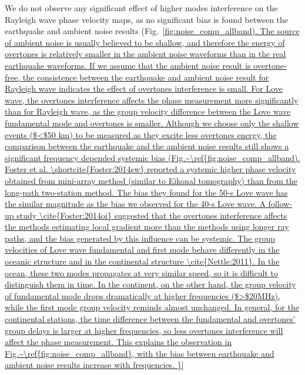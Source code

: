 \documentclass[referee]{gji}
\begin{document}
We do not observe any significant effect of higher modes interference on the Rayleigh wave phase velocity maps, as no significant bias is found between the earthquake and ambient noise results (Fig.~\ref{fig:noise_comp_allband). The source of ambient noise is usually believed to be shallow, and therefore the energy of overtones is relatively smaller in the ambient noise waveforms than in the real earthquake waveforms. If we assume that the ambient noise result is overtone-free, the consistence between the earthquake and ambient noise result for Rayleigh wave indicates the effect of overtones interference is small.

For Love wave, the overtones interference affects the phase measurement more significantly than for Rayleigh wave, as the group velocity difference between the Love wave fundamental mode and overtones is smaller. Although we choose only the shallow events ($<$50 km) to be measured as they excite less overtones energy, the comparison between the earthquake and the ambient noise results still shows a significant frequency depended systemic bias (Fig.~\ref{fig:noise_comp_allband).

Foster et al. \shortcite{Foster:2014sw} reported a systemic higher phase velocity obtained from mini-array method (similar to Eikonal tomography) than from the long-path two-station method. The bias they found for the 50-s Love wave has the similar magnitude as the bias we observed for the 40-s Love wave. A follow-up study \cite{Foster:2014oi} suggested that the overtones interference affects the methods estimating local gradient more than the methods using longer ray paths, and the bias generated by this influence can be systemic.

The group velocities of Love wave fundamental and first mode behave differently in the oceanic structure and in the continental structure \cite{Nettle:2011}. In the ocean, these two modes propagates at very similar speed, so it is difficult to distinguish them in time. In the continent, on the other hand, the group velocity of fundamental mode drops dramatically at higher frequencies ($>$20MHz), while the first mode group velocity reminds almost unchanged. In general, for the continental stations, the time difference between the fundamental and overtones’ group delays is larger at higher frequencies, so less overtones interference will affect the phase measurement. This explains the observation in Fig.~\ref{fig:noise_comp_allband}, with the bias between earthquake and ambient noise results increase with frequencies. 

}}
\end{document}
